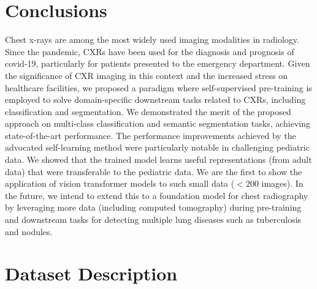 \documentclass[10pt,journal,compsoc]{IEEEtran}
\begin{document}
\section{Conclusions}
Chest x-rays are among the most widely used imaging modalities in radiology. Since the pandemic, CXRs have been used for the diagnosis and prognosis of covid-19, particularly for patients presented to the emergency department. Given the significance of CXR imaging in this context and the increased stress on healthcare facilities, we proposed a paradigm where self-supervised pre-training is employed to solve domain-specific downstream tasks related to CXRs, including classification and segmentation. We demonstrated the merit of the proposed approach on multi-class classification and semantic segmentation tasks, achieving state-of-the-art performance. The performance improvements achieved by the advocated self-learning method were particularly notable in challenging pediatric data.
We showed that the trained model learns useful representations (from adult data) that were transferable to the pediatric data. We are the first to show the application of vision transformer models to such small data ($<200$ images).  In the future, we intend to extend this to a foundation model for chest radiography by leveraging more data (including computed tomography) during pre-training and downstream tasks for detecting multiple lung diseases such as tuberculosis and nodules.   








{\small


}
\newpage
\onecolumn
\appendix

\section{Dataset Description}
\end{document}
